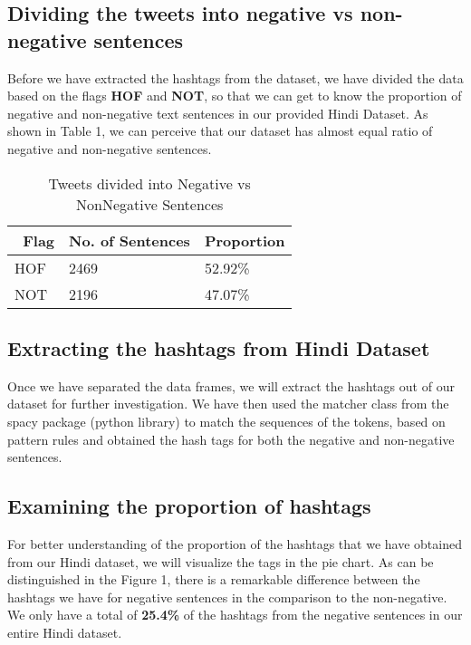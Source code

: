 \documentclass{article}
\begin{document}
\subsection{Dividing the tweets into negative vs non-negative sentences}

Before we have extracted the hashtags from the dataset, we have divided the data based on the flags \textbf{HOF} and \textbf{NOT}, so that we can get to know the proportion of negative and non-negative text sentences in our provided Hindi Dataset. As shown in Table 1, we can perceive that our dataset has almost equal ratio of negative and non-negative sentences. 

\begin{table}[b]
\begin{center}
  \caption{Tweets divided into Negative vs NonNegative Sentences}
  \centering
  \begin{tabular}{p{2cm}  l p{2cm} }
    \toprule                \
    Flag     & No. of Sentences     & Proportion \\
    \midrule
    HOF     & 2469   & 52.92\% \\
    NOT     & 2196   & 47.07\%  \\
    \bottomrule
  \end{tabular}
\end{center}
\end{table}


\subsection{Extracting the hashtags from Hindi Dataset}
Once we have separated the data frames, we will extract the hashtags out of our dataset for further investigation. We have then used the matcher class from the spacy package (python library) to match the sequences of the tokens, based on pattern rules and obtained the hash tags for both the negative and non-negative sentences.

\subsection{Examining the proportion of hashtags}

For better understanding of the proportion of the hashtags that we have obtained from our Hindi dataset, we will visualize the tags in the pie chart. As can be distinguished in the Figure 1, there is a remarkable difference between the hashtags we have for negative sentences in the comparison to the non-negative. We only have a total of \textbf{25.4\%}  of the hashtags from the negative sentences in our entire Hindi dataset.
\end{document}

